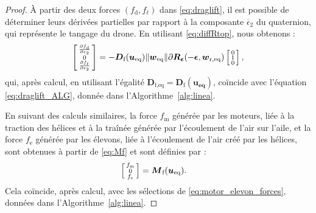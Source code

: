 \begin{proof}
À partir des deux forces $(f_{\text{d}} , f_{\ell})$ dans \eqref{eq:draglift}, il est possible de déterminer leurs dérivées partielles par rapport à la composante $\overline \epsilon_2$ du quaternion, qui représente le tangage du drone. En utilisant \eqref{eq:diffRtop}, nous obtenons :
\begin{align}
    \left[ \begin{smallmatrix}\frac{\partial  f_{\text{d}}  }{\partial \epsilon_{2}} \\ 0 \\ \frac{\partial  f_{\ell}  }{\partial \epsilon_{2}} \end{smallmatrix} \right] = - \boldsymbol{D}_{\text{f}}(\boldsymbol{u_{\text{eq}}})  \lVert \boldsymbol{w}_{\mathrm{eq}} \rVert \partial \boldsymbol{R}_{\boldsymbol{ \epsilon}}( -\boldsymbol{ \epsilon}, \boldsymbol{w}_{\mathrm{r,eq}}) \left[ \begin{smallmatrix}0\\ 1\\ 0 \end{smallmatrix} \right],
\end{align}
qui, après calcul, en utilisant l'égalité $\boldsymbol{D}_{\text{f,eq}} = \boldsymbol{D}_{\text{f}}(\boldsymbol{u_{\text{eq}}})$,
coïncide avec l'équation \eqref{eq:draglift_ALG}, donnée dans l'Algorithme~\ref{alg:linea}.

En suivant des calculs similaires, la force $f_{\text{m}}$ générée par les moteurs, liée à la traction des hélices et à la traînée générée par l'écoulement de l'air sur l'aile, et la force $f_{\text{e}}$ générée par les élevons, liée à l'écoulement de l'air créé par les hélices, sont obtenues à partir de \eqref{eq:Mf} et sont définies par :
\begin{align}
\label{eq:motor_el}
    \left[ \begin{smallmatrix} f_{\text{m}}  \\ 0 \\ f_{\text{e}}  \end{smallmatrix} \right] &= \boldsymbol{M}_{\text{f}}(\boldsymbol{u_{\text{eq}}}).
\end{align}
Cela coïncide, après calcul, avec les sélections de \eqref{eq:motor_elevon_forces}, données dans l'Algorithme~\ref{alg:linea}.


\end{proof}
